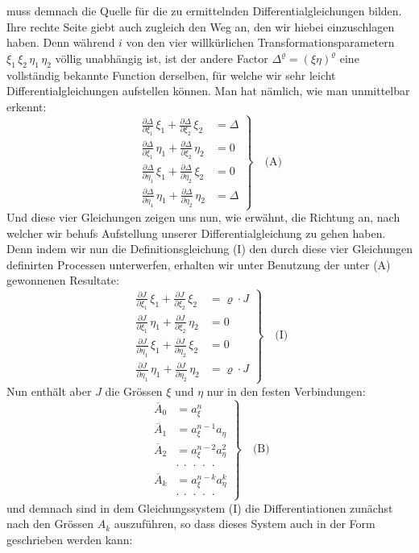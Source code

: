 muss demnach die Quelle f\"ur die zu ermittelnden Differentialgleichungen bilden. Ihre rechte Seite giebt auch zugleich den Weg an, den wir hiebei einzuschlagen haben. Denn w\"ahrend $i$ von den vier willk\"urlichen Transformationsparametern $\xi_1\, \xi_2\, \eta_1\, \eta_2$ v\"ollig unabh\"angig ist, ist der andere Factor $\Delta^{\varrho} = (\xi\eta)^{\varrho}$ eine vollst\"andig bekannte Function derselben, f\"ur welche wir sehr leicht Differentialgleichungen aufstellen k\"onnen. Man hat n\"amlich, wie man unmittelbar erkennt:
\[
\left.
\begin{aligned}
\frac{\partial \Delta}{\partial \xi_1}\, \xi_1 + \frac{\partial \Delta}{\partial \xi_2}\, \xi_2 &= \Delta\\
\frac{\partial \Delta}{\partial \xi_1}\, \eta_1 + \frac{\partial \Delta}{\partial \xi_2}\, \eta_2 &= 0\\
\frac{\partial \Delta}{\partial \eta_1}\, \xi_1 + \frac{\partial \Delta}{\partial \eta_2}\, \xi_2 &= 0\\
\frac{\partial \Delta}{\partial \eta_1}\, \eta_1 + \frac{\partial \Delta}{\partial \eta_2}\, \eta_2 &= \Delta
\end{aligned}
\right\}\quad \text{(A)}
\]
Und diese vier Gleichungen zeigen uns nun, wie erw\"ahnt, die Richtung an, nach welcher wir behufs Aufstellung unserer Differentialgleichung zu gehen haben. Denn indem wir nun die Definitionsgleichung (I) den durch diese vier Gleichungen definirten Processen unterwerfen, erhalten wir unter Benutzung der unter (A) gewonnenen Resultate:
\[
\left.
\begin{aligned}
\frac{\partial J}{\partial \xi_1}\, \xi_1 + \frac{\partial J}{\partial \xi_2}\, \xi_2 &= \varrho \cdot J\\
\frac{\partial J}{\partial \xi_1}\, \eta_1 + \frac{\partial J}{\partial \xi_2}\, \eta_2 &= 0\\
\frac{\partial J}{\partial \eta_1}\, \xi_1 + \frac{\partial J}{\partial \eta_2}\, \xi_2 &= 0\\
\frac{\partial J}{\partial \eta_1}\, \eta_1 + \frac{\partial J}{\partial \eta_2}\, \eta_2 &= \varrho \cdot J
\end{aligned}
\right\}\quad \text{(I)}
\]
Nun enth\"alt aber $J$ die Gr\"ossen $\xi$ und $\eta$ nur in den festen Verbindungen:
\[
\left.
\begin{aligned}
\overline{A}_0 &= a_{\xi}^n\\
\overline{A}_1 &= a_{\xi}^{n-1} a_{\eta}\\
\overline{A}_2 &= a_{\xi}^{n-2} a_{\eta}^2\\
&\cdot\ \cdot\ \cdot\ \cdot\ \cdot\\
\overline{A}_k &= a_{\xi}^{n-k} a_{\eta}^k\\
&\cdot\ \cdot\ \cdot\ \cdot\ \cdot
\end{aligned}
\right\}\quad \text{(B)}
\]
und demnach sind in dem Gleichungssystem (I) die Differentiationen zun\"achst nach den Gr\"ossen $A_k$ auszuf\"uhren, so dass dieses System auch in der Form geschrieben werden kann:


